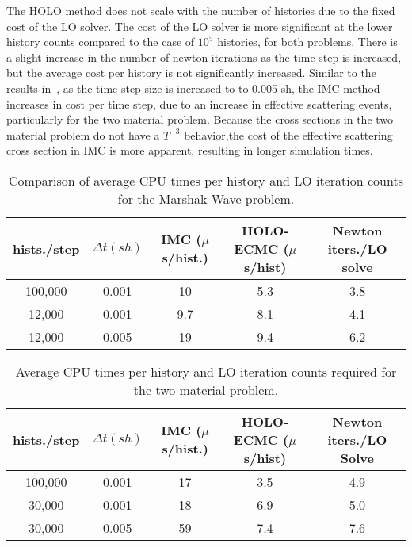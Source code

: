 The HOLO method does not scale with the number of
histories due to the fixed cost of the LO solver.  The cost of the LO solver is more
significant at the lower history counts compared to the case of $10^5$
histories, for both problems. 
There is a slight increase in the number of
newton iterations as the time step is increased, but the average cost per history is
not significantly increased.   Similar to the results
in~\cite{park}, as the time step size is increased to to 0.005 sh, the IMC method
increases in cost per time step, due to an increase in effective scattering events, particularly for the two material problem. Because
the cross sections in the two material problem do not have a $T^{-3}$
behavior,the cost of the effective scattering cross section in IMC is more apparent,
resulting in longer simulation times. 
\begin{table}[H]
\centering
\caption{\label{marshak_table} {Comparison of average CPU times per history
    and LO iteration counts for the Marshak Wave problem. }}
\vspace{-0.1in}
	\begin{tabular}{|cc|c|cc|}\hline
hists./step & $\Delta t (sh)$ & IMC ($\mu$s/hist.) & HOLO-ECMC ($\mu$s/hist) & Newton
iters./LO solve \\ \hline
100,000                    &   0.001	& 10  &  5.3   & 3.8               \\
12,000           &   0.001	& 9.7 &	 8.1   & 4.1               \\
12,000          &   0.005	& 19  &  9.4   & 6.2                \\ \hline
\end{tabular}
\end{table}

\begin{table}[htb!]
\centering
\caption{\label{twomat_table} {Average CPU times per history and LO iteration
counts required for the two material problem.}}
	\begin{tabular}{|cc|c|cc|} \hline
hists./step & $\Delta t (sh)$ & IMC ($\mu$s/hist.) & HOLO-ECMC ($\mu$s/hist)  &
Newton iters./LO Solve\\ \hline
100,000          &   0.001	& 17  &	3.5   & 4.9 \\
30,000   &    0.001	& 18  &	6.9   &    5.0 \\
30,000    &   0.005	& 59  & 7.4   &    7.6 \\ \hline
\end{tabular}
\end{table}

